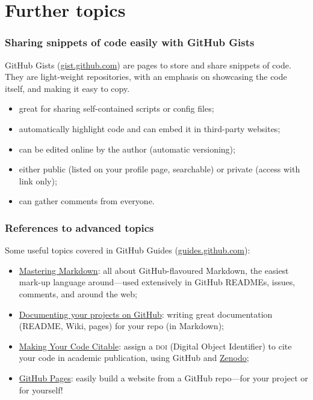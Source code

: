 \documentclass[10pt,svgnames,handout]{beamer}
\begin{document}
\section{Further topics}
\begin{frame}
\frametitle{Sharing snippets of code easily with GitHub Gists}
GitHub Gists (\href{https://gist.github.com/}{gist.github.com}) are pages to store and share snippets of code. They are light-weight repositories, with an emphasis on showcasing the code itself, and making it easy to copy.\\
\pause
\begin{itemize}
  \item great for sharing self-contained scripts or config files;
  \item automatically highlight code and can embed it in third-party websites;
  \item can be edited online by the author (automatic versioning);
  \item either public (listed on your profile page, searchable) or private (access with link only);
  \item can gather comments from everyone.
\end{itemize}
\end{frame}
\begin{frame}


\frametitle{References to advanced topics}
Some useful topics covered in GitHub Guides (\href{https://guides.github.com/}{guides.github.com}):
\begin{itemize}
  \item \href{https://guides.github.com/features/mastering-markdown/}{Mastering Markdown}: all about GitHub-flavoured Markdown, the easiest mark-up language around—used extensively in GitHub READMEs, issues, comments, and around the web;
  \item \href{https://guides.github.com/features/wikis/}{Documenting your projects on GitHub}: writing great documentation (README, Wiki, pages) for your repo (in Markdown);
  \item \href{https://guides.github.com/activities/citable-code/}{
Making Your Code Citable}: assign a \textsc{doi} (Digital Object Identifier) to cite your code in academic publication, using GitHub and \href{https://zenodo.org/}{Zenodo};
  \item \href{https://guides.github.com/features/pages/}{GitHub Pages}: easily build a website from a GitHub repo—for your project or for yourself!
\end{itemize}
\end{frame}
\end{document}
